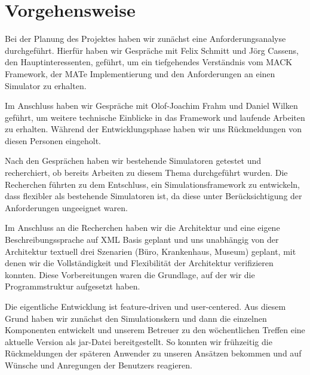 

\section{Vorgehensweise}\label{sec:approach}
Bei der Planung des Projektes haben wir zunächst eine Anforderungsanalyse durchgeführt. Hierfür haben wir Gespräche mit Felix Schmitt und Jörg Cassens, den Hauptinteressenten, geführt, um ein tiefgehendes Verständnis vom MACK Framework, der MATe Implementierung und den Anforderungen an einen Simulator zu erhalten.

Im Anschluss haben wir Gespräche mit Olof-Joachim Frahm und Daniel Wilken geführt, um weitere technische Einblicke in das Framework und laufende Arbeiten zu erhalten. Während der Entwicklungsphase haben wir uns Rückmeldungen von diesen Personen eingeholt.

Nach den Gesprächen haben wir bestehende Simulatoren getestet und recherchiert, ob bereits Arbeiten zu diesem Thema durchgeführt wurden. Die Recherchen führten zu dem Entschluss, ein Simulationsframework zu entwickeln, dass flexibler als bestehende Simulatoren ist, da diese unter Berücksichtigung der Anforderungen ungeeignet waren.

Im Anschluss an die Recherchen haben wir die Architektur und eine eigene Beschreibungssprache auf XML Basis geplant und uns unabhängig von der Architektur textuell drei Szenarien (Büro, Krankenhaus, Museum) geplant, mit denen wir die Vollständigkeit und Flexibilität der Architektur verifizieren konnten. Diese Vorbereitungen waren die Grundlage, auf der wir die Programmstruktur aufgesetzt haben.

Die eigentliche Entwicklung ist feature-driven und user-centered. Aus diesem Grund haben wir zunächst den Simulationskern und dann die einzelnen Komponenten entwickelt und unserem Betreuer zu den wöchentlichen Treffen eine aktuelle Version als jar-Datei bereitgestellt. So konnten wir frühzeitig die Rückmeldungen der späteren Anwender zu unseren Ansätzen bekommen und auf Wünsche und Anregungen der Benutzers reagieren.



